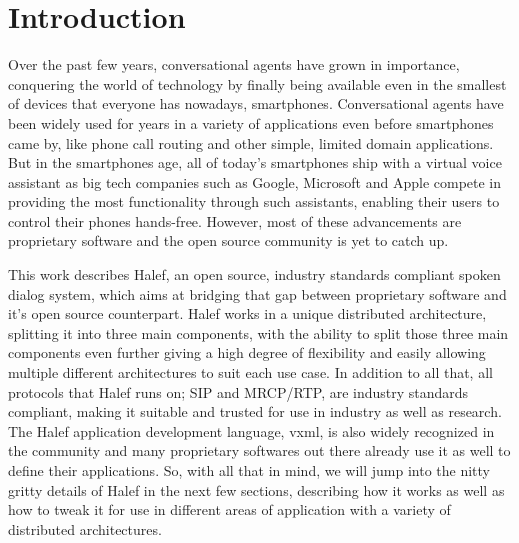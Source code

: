 \chapter{Introduction}
\label{chap:intro}

Over the past few years, conversational agents have grown in importance, conquering the world of technology by finally being available even in the smallest of devices that everyone has nowadays, smartphones.
Conversational agents have been widely used for years in a variety of applications even before smartphones came by, like phone call routing and other simple, limited domain applications.
But in the smartphones age, all of today's smartphones ship with a virtual voice assistant as big tech companies such as Google, Microsoft and Apple compete in providing the most functionality through such assistants, enabling their users to control their phones hands-free.
However, most of these advancements are proprietary software and the open source community is yet to catch up.

This work describes Halef\cite{modernconvagents}, an open source, industry standards compliant spoken dialog system\cite{opensrcsds}\cite{archopensrcsds}, which aims at bridging that gap between proprietary software and it's open source counterpart.
Halef works in a unique distributed architecture, splitting it into three main components, with the ability to split those three main components even further giving a high degree of flexibility and easily allowing multiple different architectures to suit each use case.
In addition to all that, all protocols that Halef runs on; SIP and MRCP/RTP, are industry standards compliant, making it suitable and trusted for use in industry as well as research.
The Halef application development language, \ac{vxml}, is also widely recognized in the community and many proprietary softwares out there already use it as well to define their applications.
So, with all that in mind, we will jump into the nitty gritty details of Halef in the next few sections, describing how it works as well as how to tweak it for use in different areas of application with a variety of distributed architectures.

